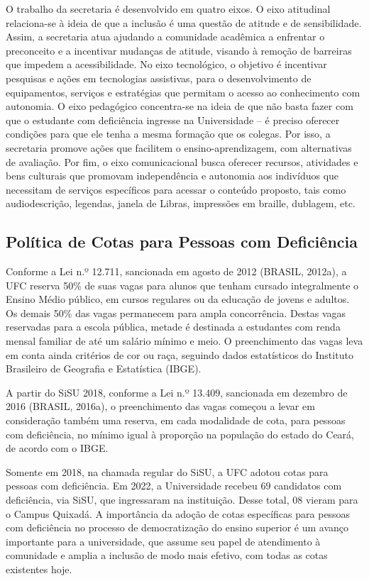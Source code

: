 O trabalho da secretaria é desenvolvido em quatro eixos. O eixo atitudinal relaciona-se à ideia de que a inclusão é uma questão de atitude e de sensibilidade. Assim, a secretaria atua ajudando a comunidade acadêmica a enfrentar o preconceito e a incentivar mudanças de atitude, visando à remoção de barreiras que impedem a acessibilidade. No eixo tecnológico, o objetivo é incentivar pesquisas e ações em tecnologias assistivas, para o desenvolvimento de equipamentos, serviços e estratégias que permitam o acesso ao conhecimento com autonomia. O eixo pedagógico concentra-se na ideia de que não basta fazer com que o estudante com deficiência ingresse na Universidade – é preciso oferecer condições para que ele tenha a mesma formação que os colegas. Por isso, a secretaria promove ações que facilitem o ensino-aprendizagem, com alternativas de avaliação. Por fim, o eixo comunicacional busca oferecer recursos, atividades e bens culturais que promovam independência e autonomia aos indivíduos que necessitam de serviços específicos para acessar o conteúdo proposto, tais como audiodescrição, legendas, janela de Libras, impressões em braille, dublagem, etc.

\subsection{Política de Cotas para Pessoas com Deficiência}
Conforme a Lei n.º 12.711, sancionada em agosto de 2012 (BRASIL, 2012a), a UFC reserva 50\% de suas vagas para alunos que tenham cursado integralmente o Ensino Médio público, em cursos regulares ou da educação de jovens e adultos. Os demais 50\% das vagas permanecem para ampla concorrência. Destas vagas reservadas para a escola pública, metade é destinada a estudantes com renda mensal familiar de até um salário mínimo e meio. O preenchimento das vagas leva em conta ainda critérios de cor ou raça, seguindo dados estatísticos do Instituto Brasileiro de Geografia e Estatística (IBGE).

A partir do SiSU 2018, conforme a Lei n.º 13.409, sancionada em dezembro de 2016 (BRASIL, 2016a), o preenchimento das vagas começou a levar em consideração também uma reserva, em cada modalidade de cota, para pessoas com deficiência, no mínimo igual à proporção na população do estado do Ceará, de acordo com o IBGE.

Somente em 2018, na chamada regular do SiSU, a UFC adotou cotas para pessoas com deficiência. Em 2022, a Universidade recebeu 69 candidatos com deficiência, via SiSU, que ingressaram na instituição. Desse total, 08 vieram para o Campus Quixadá. A importância da adoção de cotas específicas para pessoas com deficiência no processo de democratização do ensino superior é um avanço importante para a universidade, que assume seu papel de atendimento à comunidade e amplia a inclusão de modo mais efetivo, com todas as cotas existentes hoje.



